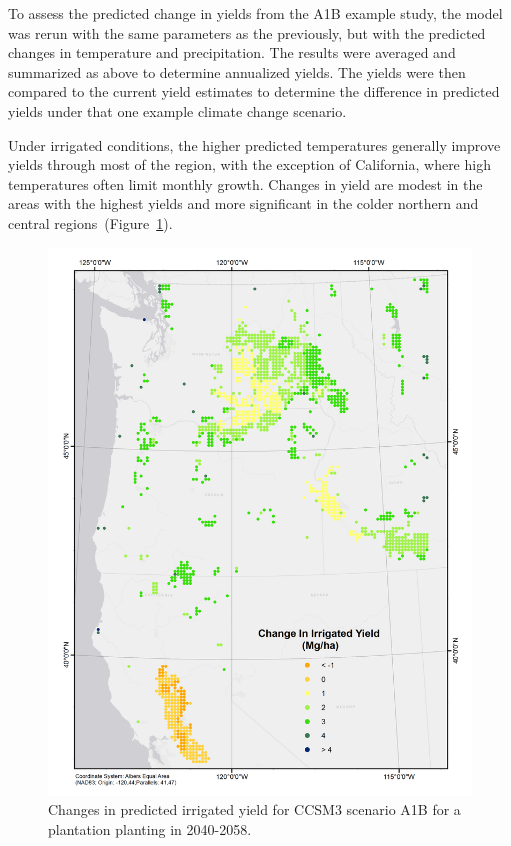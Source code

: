 \documentclass[preprint,12pt]{elsarticle}
\begin{document}

To assess the predicted change in yields from the A1B example study,
the model was rerun with the same parameters as the previously, but
with the predicted changes in temperature and precipitation.  The
results were averaged and summarized as above to determine annualized
yields.  The yields were then compared to the current yield estimates
to determine the difference in predicted yields under that one example
climate change scenario.  

Under irrigated conditions, the higher predicted temperatures
generally improve yields through most of the region, with the
exception of California, where high temperatures often limit monthly
growth.  Changes in yield are modest in the areas with the highest
yields and more significant in the colder northern and central
regions~(Figure~\ref{fig:new_irrigated}).
 
\begin{figure}[hp]
  \centering
  \includegraphics[width=1\linewidth]{climate_irrigated}
  \caption{Changes in predicted irrigated yield for \ac{CCSM3} scenario A1B
    for a plantation planting in 2040-2058.}
  \label{fig:new_irrigated}
\end{figure}
\end{document}
